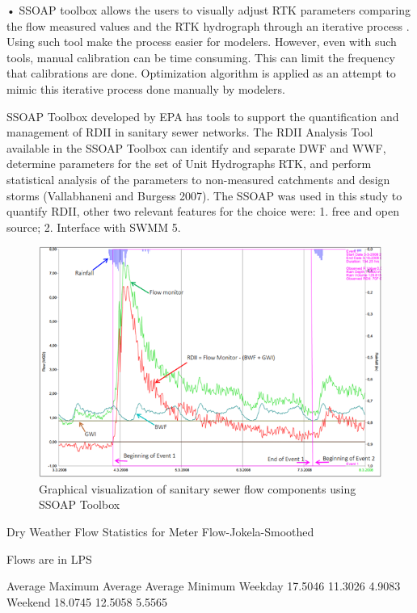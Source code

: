 •	SSOAP toolbox allows the users to visually adjust RTK parameters comparing the flow measured values and the RTK hydrograph through an iterative process \cite{Vallabhaneni2007}. Using such tool make the process easier for modelers. However, even with such tools, manual calibration can be time consuming. This can limit the frequency that calibrations are done. Optimization algorithm is applied as an attempt to mimic this iterative process done manually by modelers.

SSOAP Toolbox developed by \ac{EPA} has tools to support the quantification and management of RDII in sanitary sewer networks. The RDII Analysis Tool available in the SSOAP Toolbox can identify and separate DWF and WWF, determine parameters for the set of Unit Hydrographs RTK, and perform statistical analysis of the parameters to non-measured catchments and design storms (Vallabhaneni and Burgess 2007). The SSOAP was used in this study to quantify RDII, other two relevant features for the choice were: 1. free and open source; 2. Interface with SWMM 5.


\begin{figure}[ht]
    \centering
	\includegraphics[scale=1.2]{figures/SSOAP_example.png}
	\caption{Graphical visualization of sanitary sewer flow components using SSOAP Toolbox}
	\label{fig:SSOAPexample}
\end{figure}

Dry Weather Flow Statistics for Meter Flow-Jokela-Smoothed

Flows are in LPS

           Average Maximum   Average   Average Minimum
Weekday       17.5046       11.3026        4.9083
Weekend       18.0745       12.5058        5.5565



